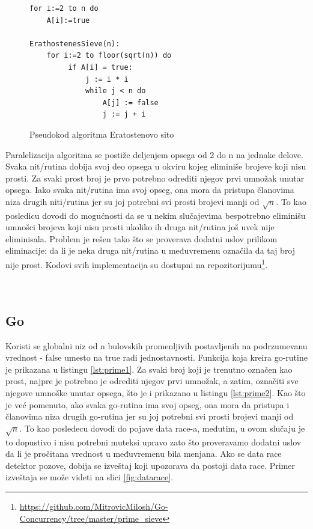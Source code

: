 \documentclass[12pt,oneside]{memoir}
\begin{document}
\begin{figure}
\begin{center}

\begin{Verbatim}[fontsize=\small]
for i:=2 to n do
    A[i]:=true

ErathostenesSieve(n):
    for i:=2 to floor(sqrt(n)) do 
         if A[i] = true:
             j := i * i
             while j < n do
                 A[j] := false 
                 j := j + i
\end{Verbatim}

\caption{Pseudokod algoritma Eratostenovo sito}
\label{fig:prime_pseudo}
\end{center}
\end{figure}

Paralelizacija algoritma se postiže deljenjem opsega od 2 do n na jednake delove. Svaka nit/rutina dobija svoj deo opsega u okviru kojeg eliminiše brojeve koji nisu prosti. Za svaki prost broj je prvo potrebno odrediti njegov prvi umnožak unutar opsega. Iako svaka nit/rutina ima svoj opseg, ona mora da pristupa članovima niza drugih niti/rutina jer su joj potrebni svi prosti brojevi manji od $\sqrt{n}$. To kao posledicu dovodi do mogućnosti da se u nekim slučajevima bespotrebno eliminišu umnošci brojeva koji nisu prosti ukoliko ih druga nit/rutina još uvek nije eliminisala. Problem je rešen tako što se proverava dodatni uslov prilikom eliminacije: da li je neka druga nit/rutina u međuvremenu označila da taj broj nije prost. Kodovi svih implementacija su dostupni na repozitorijumu\footnote{\url{https://github.com/MitrovicMilosh/Go-Concurrency/tree/master/prime_sieve}}.
\\
\\
\\


\subsection{Go}

Koristi se globalni niz od n bulovskih promenljivih postavljenih na podrzumevanu vrednost - false umesto na true radi jednostavnosti.  Funkcija koja kreira go-rutine je prikazana u listingu \ref{lst:prime1}. Za svaki broj koji je trenutno označen kao prost, najpre je potrebno je odrediti njegov prvi umnožak, a zatim, označiti sve njegove umnoške unutar opsega, što je i prikazano u listingu \ref{lst:prime2}. Kao što je već pomenuto, ako svaka go-rutina ima svoj opseg, ona mora da pristupa i članovima niza drugih go-rutina jer su joj potrebni svi prosti brojevi manji od $\sqrt{n}$. To kao posledecu dovodi do pojave data race-a, međutim, u ovom slučaju je to dopustivo i nisu potrebni muteksi upravo zato što proveravamo dodatni uslov da li je pročitana vrednost u međuvremenu bila menjana. Ako se data race detektor pozove, dobija se izveštaj koji upozorava da postoji data race. Primer izveštaja se može videti na slici \ref{fig:datarace}. 
\end{document}
